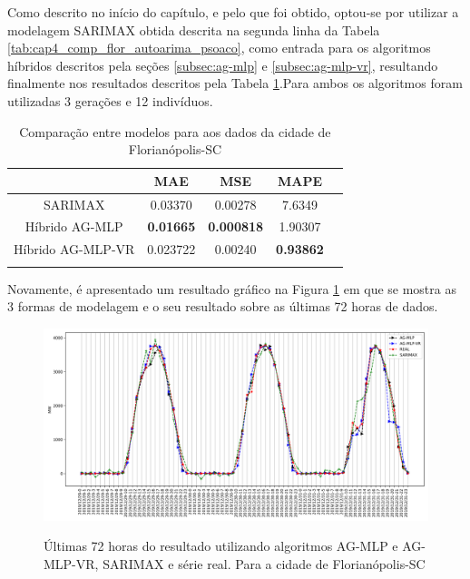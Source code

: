 Como descrito no início do capítulo, e pelo que foi obtido, optou-se por utilizar a modelagem SARIMAX obtida descrita na segunda linha da Tabela \ref{tab:cap4_comp_flor_autoarima_psoaco}, como entrada para os algoritmos híbridos descritos pela seções \ref{subsec:ag-mlp} e \ref{subsec:ag-mlp-vr}, resultando finalmente nos resultados descritos pela Tabela \ref{tab:cap4_comp_flor_agmlp_agmlpvr}.Para ambos os algoritmos foram utilizadas 3 gerações e 12 indivíduos.

\begin{table}[htbp]
\caption{Comparação entre modelos para aos dados da cidade de Florianópolis-SC}
\begin{center}
\begin{tabular}{ccccc}
                & MAE & MSE & MAPE \\\hline
SARIMAX         & 0.03370 & 0.00278 & 7.6349 \\\hline
Híbrido AG-MLP  & \textbf{0.01665} & \textbf{0.000818} & 1.90307 \\\hline
Híbrido AG-MLP-VR & 0.023722 & 0.00240 & \textbf{0.93862} \\\hline
\label{tab:cap4_comp_flor_agmlp_agmlpvr}
\end{tabular}
\end{center}
\end{table}

Novamente, é apresentado um resultado gráfico na Figura \ref{fig:cap4_flor_3_days_hibrids} em que se mostra as 3 formas de modelagem e o seu resultado sobre as últimas 72 horas de dados.

\begin{figure}[!htbp]
    \centering
    \caption{Últimas 72 horas do resultado utilizando algoritmos AG-MLP e AG-MLP-VR, SARIMAX e série real. Para a cidade de Florianópolis-SC}
    \includegraphics[width=\textwidth]{Figuras/results/comparison_hibrids_fl.png}
    \label{fig:cap4_flor_3_days_hibrids}
\end{figure}

